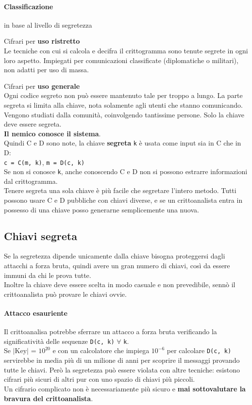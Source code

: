 \documentclass[10pt]{book}
\begin{document}
\paragraph{Classificazione} in base al livello di segretezza
\begin{list}{}{}
	\item Cifrari per \textbf{uso ristretto}\\
	Le tecniche con cui si calcola e decifra il crittogramma sono tenute segrete in ogni loro aspetto. Impiegati per comunicazioni classificate (diplomatiche o militari), non adatti per uso di massa.
	\item Cifrari per \textbf{uso generale}\\
	Ogni codice segreto non può essere mantenuto tale per troppo a lungo. La parte segreta si limita alla chiave, nota solamente agli utenti che stanno comunicando.\\
	Vengono studiati dalla comunità, coinvolgendo tantissime persone. Solo la chiave deve essere segreta.\\
	\textbf{Il nemico conosce il sistema}.\\
	Quindi C e D sono note, la chiave \textbf{segreta} \texttt{k} è usata come input sia in C che in D:\\
	\texttt{c = C(m, k)}, \texttt{m = D(c, k)}\\
	Se non si conosce \texttt{k}, anche conoscendo C e D non si possono estrarre informazioni dal crittogramma.\\
	Tenere segreta una sola chiave è più facile che segretare l'intero metodo. Tutti possono usare C e D pubbliche con chiavi diverse, e se un crittoanalista entra in possesso di una chiave posso generarne semplicemente una nuova.
\end{list}
\subsection{Chiavi segreta} Se la segretezza dipende unicamente dalla chiave bisogna proteggersi dagli attacchi a forza bruta, quindi avere un gran numero di chiavi, così da essere immuni da chi le prova tutte.\\
Inoltre la chiave deve essere scelta in modo casuale e non prevedibile, sennò il crittoanalista può provare le chiavi ovvie.
\paragraph{Attacco esauriente} Il crittoanalisa potrebbe sferrare un attacco a forza bruta verificando la significatività delle sequenze \texttt{D(c, k)} $\forall$ \texttt{k}.\\
Se $|$Key$|$ = $10^{20}$ e con un calcolatore che impiega $10^{-6}$ per calcolare \texttt{D(c, k)} servirebbe in media più di un milione di anni per scoprire il messaggi provando tutte le chiavi. Però la segretezza può essere violata con altre tecniche: esistono cifrari più sicuri di altri pur con uno spazio di chiavi più piccoli.\\
Un cifrario complicato non è necessariamente più sicuro e \textbf{mai sottovalutare la bravura del crittoanalista}.
\end{document}
